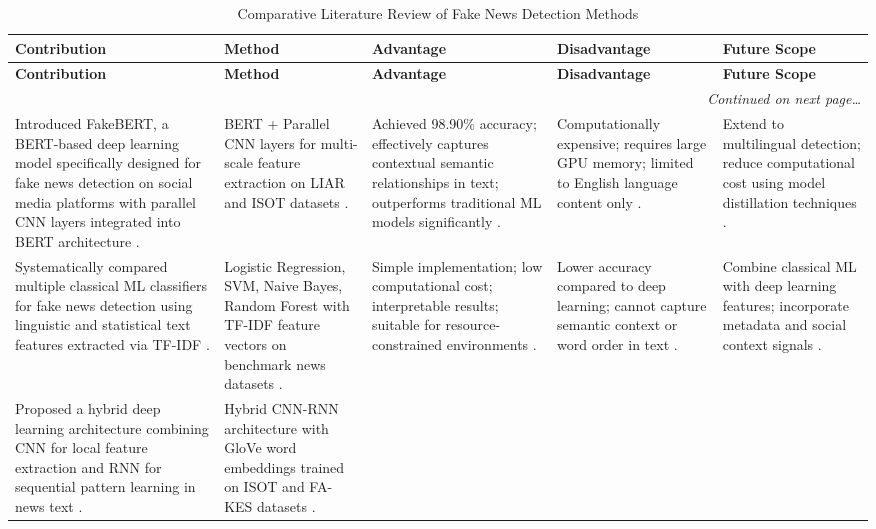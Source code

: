 \documentclass[runningheads]{llncs}
\begin{document}
\begin{longtable}{|p{}|p{}|p{}|p{}|p{}|}
\caption{Comparative Literature Review of Fake News Detection Methods} \label{tab:litreview} \\
\hline
\textbf{Contribution} & \textbf{Method} & \textbf{Advantage} & \textbf{Disadvantage} & \textbf{Future Scope} \\ \hline
\endfirsthead
\hline
\textbf{Contribution} & \textbf{Method} & \textbf{Advantage} & \textbf{Disadvantage} & \textbf{Future Scope} \\ \hline
\endhead
\hline
\multicolumn{5}{r}{\small\textit{Continued on next page\ldots}} \\
\endfoot
\hline
\endlastfoot
Introduced FakeBERT, a BERT-based deep learning model specifically designed for fake news detection on social media platforms with parallel CNN layers integrated into BERT architecture \cite{Kaliyar2021FakeBERT}. &
BERT + Parallel CNN layers for multi-scale feature extraction on LIAR and ISOT datasets \cite{Kaliyar2021FakeBERT}. &
Achieved 98.90\% accuracy; effectively captures contextual semantic relationships in text; outperforms traditional ML models significantly \cite{Kaliyar2021FakeBERT}. &
Computationally expensive; requires large GPU memory; limited to English language content only \cite{Kaliyar2021FakeBERT}. &
Extend to multilingual detection; reduce computational cost using model distillation techniques \cite{Kaliyar2021FakeBERT}. \\ \hline
Systematically compared multiple classical ML classifiers for fake news detection using linguistic and statistical text features extracted via TF-IDF \cite{Aphiwongsophon2021Detecting}. &
Logistic Regression, SVM, Naive Bayes, Random Forest with TF-IDF feature vectors on benchmark news datasets \cite{Aphiwongsophon2021Detecting}. &
Simple implementation; low computational cost; interpretable results; suitable for resource-constrained environments \cite{Aphiwongsophon2021Detecting}. &
Lower accuracy compared to deep learning; cannot capture semantic context or word order in text \cite{Aphiwongsophon2021Detecting}. &
Combine classical ML with deep learning features; incorporate metadata and social context signals \cite{Aphiwongsophon2021Detecting}. \\ \hline
Proposed a hybrid deep learning architecture combining CNN for local feature extraction and RNN for sequential pattern learning in news text \cite{Nasir2021FakeNews}. &
Hybrid CNN-RNN architecture with GloVe word embeddings trained on ISOT and FA-KES datasets \cite{Nasir2021FakeNews}. &

\end{longtable}
\end{document}
